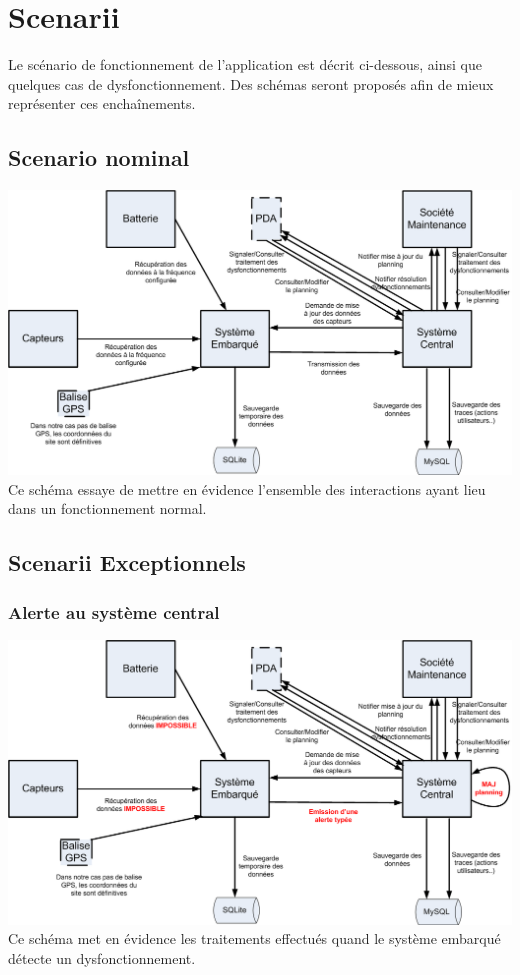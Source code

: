 \section{Scenarii}

Le scénario de fonctionnement de l'application est décrit ci-dessous, ainsi que quelques
cas de dysfonctionnement. Des schémas seront proposés afin de mieux représenter ces enchaînements.

    \subsection{Scenario nominal}
    \includegraphics[width = \textwidth] {./img/Cas_Normal.png}
Ce schéma essaye de mettre en évidence l'ensemble des interactions ayant lieu dans un fonctionnement normal.

    \subsection{Scenarii Exceptionnels}

            \subsubsection{Alerte au système central}
            \includegraphics[width = \textwidth] {./img/Alertes.png}
Ce schéma met en évidence les traitements effectués quand le système embarqué détecte un dysfonctionnement.


